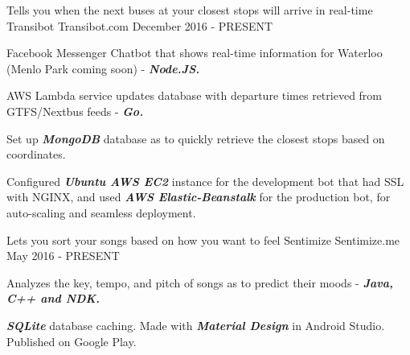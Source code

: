 \begin{cventries}
	\cventry
    {Tells you when the next buses at your closest stops will arrive in real-time}
    {Transibot}
    {Transibot.com}
    {December 2016 - PRESENT}
    {
      \begin{cvitems}
        \item {Facebook Messenger Chatbot that shows real-time information for Waterloo (Menlo Park coming soon) - \textbf{\textit{Node.JS.}}}
        \item {AWS Lambda service updates database with departure times retrieved from GTFS/Nextbus feeds - \textbf{\textit{Go.}}}
        \item {Set up \textbf{\textit{MongoDB}} database as to quickly retrieve the closest stops based on coordinates.}
        \item {Configured \textbf{\textit{Ubuntu AWS EC2}} instance for the development bot that had SSL with NGINX, and used \textbf{\textit{AWS Elastic-Beanstalk}} for the production bot, for auto-scaling and seamless deployment.}
      \end{cvitems}
    }
  \cventry
    {Lets you sort your songs based on how you want to feel}
    {Sentimize}
    {Sentimize.me}
    {May 2016 - PRESENT}
    {
      \begin{cvitems}
        \item {Analyzes the key, tempo, and pitch of songs as to predict their moods - \textbf{\textit{Java, C++ and NDK.}}}
        \item {\textbf{\textit{SQLite}} database caching. Made with \textbf{\textit{Material Design}} in Android Studio. Published on Google Play.}
      \end{cvitems}
    }
\end{cventries}
